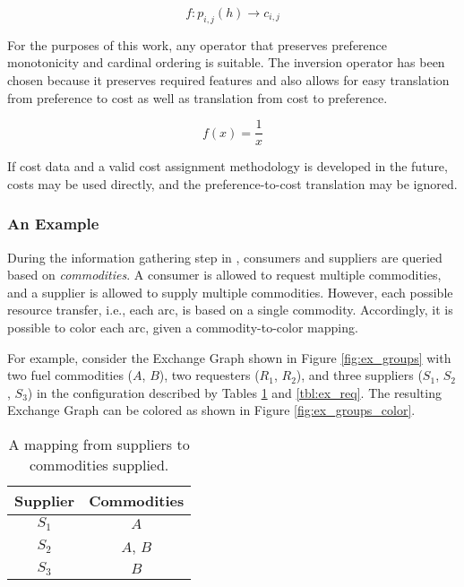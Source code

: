 \begin{equation}
f : p_{i,j}(h) \to c_{i,j}
\end{equation}

\noindent
For the purposes of this work, any operator that preserves preference
monotonicity and cardinal ordering is suitable.  The inversion operator has been
chosen because it preserves required features and also allows for easy
translation from preference to cost as well as translation from cost to
preference.

\begin{equation}
f(x) = \frac{1}{x}
\end{equation}

If cost data and a valid cost assignment methodology is developed in the future,
costs may be used directly, and the preference-to-cost translation may be
ignored.

\subsubsection{An Example}

During the information gathering step in , consumers and
suppliers are queried based on \textit{commodities}. A consumer is allowed to
request multiple commodities, and a supplier is allowed to supply multiple
commodities. However, each possible resource transfer, i.e., each arc, is based
on a single commodity. Accordingly, it is possible to color each arc, given a
commodity-to-color mapping.

For example, consider the Exchange Graph shown in Figure \ref{fig:ex_groups}
with two fuel commodities ($A$, $B$), two requesters ($R_1$, $R_2$), and three
suppliers ($S_1$, $S_2$, $S_3$) in the configuration described by Tables
\ref{tbl:ex_sup} and \ref{tbl:ex_req}. The resulting Exchange Graph can be
colored as shown in Figure \ref{fig:ex_groups_color}.

\begin{table}[h]
\centering
\begin{tabular}{c|c}
Supplier & Commodities \\ \hline
$S_1$             & $A$         \\
$S_2$             & $A$, $B$    \\
$S_3$             & $B$         \\
\end{tabular}
\caption{A mapping from suppliers to commodities supplied.}
\label{tbl:ex_sup}
\end{table}

